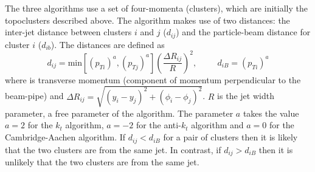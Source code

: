 The three algorithms use a set of four-momenta (clusters), which are initially the topoclusters described above.
The algorithm makes use of two distances: the inter-jet distance between clusters $i$ and $j$ ($d_{ij}$) 
and the particle-beam distance for cluster $i$ ($d_{ib}$). The distances are defined as
\begin{equation}
  d_{ij} = \text{min}[(p_{ Ti})^a, (p_{ Tj})^a]  \left(\frac{\Delta  R_{ij}}{R}\right) ^2, \hspace{1cm}  d_{iB} = (p_{Ti})^a  \label{dij}
\end{equation}
where \pT{} is transverse momentum (component of momentum perpendicular to the beam-pipe)
and $\Delta R_{ij} = \sqrt{(y_{i}-y_{j})^2 + (\phi_{i}-\phi_{j})^2}$.
$R$ is the jet width parameter, a free parameter of the algorithm.
The parameter $a$ takes the value $a = 2$ for the $k_t$ algorithm, $a = -2$ for the anti-$k_t$ algorithm 
and  $a = 0$ for the Cambridge-Aachen algorithm.
If $d_{ij} < d_{iB}$ for a pair of clusters then it is likely that the two clusters are from the same jet. 
In contrast, if $d_{ij} > d_{iB}$ then it is unlikely that the two clusters are from the same jet.

 
